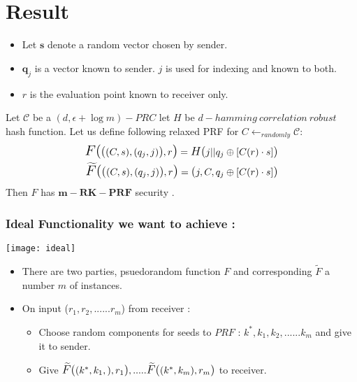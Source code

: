 \documentclass[hyperref={pdfpagelabels=false}]{beamer}
\theoremstyle{remark}
\begin{document}
\section{Result}
\begin{frame}
\begin{itemize}
\item Let $\mathbf{s}$ denote a random vector chosen by sender.\pause
\item $\mathbf{q}_j$ is a vector known to sender. $j$ is used for indexing and known to both.\pause
\item $r$ is the evaluation point known to receiver only.\pause
\end{itemize}
\begin{lemma}[2]
Let $\mathcal{C}$ be a $(d,\epsilon+\log{m})-PRC$ let  $H$ be $d-hamming\ correlation\ robust$ hash function. Let us define following relaxed PRF for $C \leftarrow_{randomly} \mathcal{C}:$
\begin{align*}
\mathlarger{\mathlarger{F(}} \mathlarger{(}  (C,s),(q_j,j)\mathlarger{)}, r \mathlarger{\mathlarger{)}} = \mathlarger{H(} j||q_j \oplus [C(r)\cdot s] \mathlarger{)}
\\
\mathlarger{\mathlarger{\widetilde{F}(}} \mathlarger{(}  (C,s),(q_j,j)\mathlarger{)}, r \mathlarger{\mathlarger{)}} = \mathlarger{(} j, C, q_j \oplus [C(r)\cdot s] \mathlarger{)}
\end{align*}
Then $F$ has $\mathbf{m-RK-PRF}$ security .
\end{lemma}
\end{frame}
\begin{frame}
\frametitle{Ideal Functionality we want to achieve :}
\begin{center}
\texttt{[image: ideal]}
\end{center}
\begin{itemize}
\item There are two parties, psuedorandom function $F$ and corresponding $\widetilde{F}$ a number $m$ of instances.\pause
\item On input ($r_1,r_2,......r_m$) from receiver :
	\begin{itemize}
	\item Choose random components for seeds to $PRF$ : $k^*, k_1, k_2, ......k_m$ and give it to sender.\pause
	\item Give $\mathlarger{\mathlarger{\widetilde{F}(}} \mathlarger{(}  k^*,k_1, \mathlarger{)}, r_1 \mathlarger{\mathlarger{)}},.....\mathlarger{\mathlarger{\widetilde{F}(}} \mathlarger{(}  k^*,k_m \mathlarger{)}, r_m \mathlarger{\mathlarger{)}}$ to receiver.
\end{itemize}	 
\end{itemize} 
\end{frame}
\end{document}
